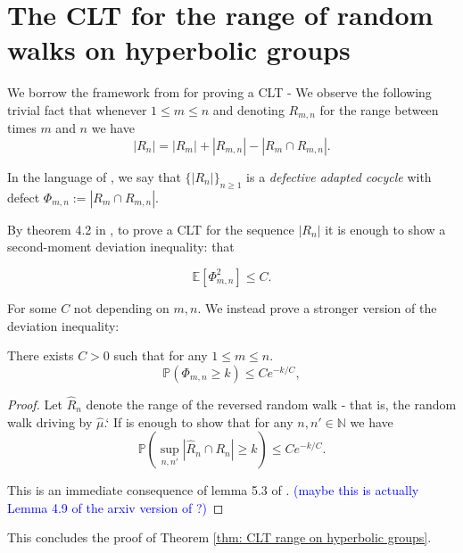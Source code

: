 \section{The CLT for the range of random walks on hyperbolic groups}

We borrow the framework from \cite{MathieuSisto2020} for proving a CLT - We observe the following trivial fact that whenever $ 1 \leq m \leq n $ and denoting $ R _{m,n} $ for the range between times $ m $ and $ n $ we have 
\[ |R _{n}| = |R _{m}| + |R _{m,n}| - |R _{m} \cap R _{m,n}|  .\]

In the language of \cite{MathieuSisto2020}, we say that $ \{ |R _{n}| \} _{n\geq 1} $ is a \emph{defective adapted cocycle} with defect $ \Phi _{m,n} := |R _{m} \cap R _{m,n}| $.

By theorem 4.2 in \cite{MathieuSisto2020}, to prove a CLT for the sequence $ |R _{n}| $ it is enough to show a second-moment deviation inequality: that 

\[ \mathbb{E} [\Phi _{m,n} ^{2} ] \leq C .\] 

For some $ C $ not depending on $ m,n $. We instead prove a stronger version of the deviation inequality:

\begin{prop}  There exists $ C>0 $ such that for any $ 1 \leq m \leq n $.
	\[ \mathbb{P}(\Phi _{m,n} \geq k) \leq Ce ^{-k/C} ,\]
\end{prop}
\begin{proof}
	Let $ \hat{R} _{n} $ denote the range of the reversed random walk - that is, the random walk driving by $ \hat{\mu} $.` If is enough to show that for any $ n, n' \in \mathbb{N} $ we have 
	\[ \mathbb{P}(\sup _{n, n'} |\hat{R} _{n} \cap R _{n} | \geq k) \leq Ce ^{-k/C} .\]
	
	This is an immediate consequence of lemma 5.3 of \cite{Choi2023deviation}. \textcolor{blue}{(maybe this is actually Lemma 4.9 of the arxiv version of \cite{Choi2023deviation}?)}
\end{proof}

This concludes the proof of Theorem \ref{thm: CLT range on hyperbolic groups}.